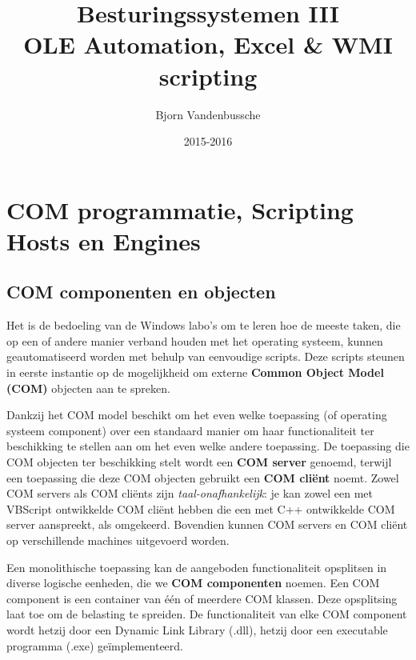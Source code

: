 \documentclass[11pt,a4paper]{report}
\title{Besturingssystemen III \\ \Large{OLE Automation, Excel \& WMI scripting}}
\author{Bjorn Vandenbussche}
\date{2015-2016}
\begin{document}
\maketitle
\tableofcontents
\chapter{COM programmatie, Scripting Hosts en Engines}
\section{COM componenten en objecten}
Het is de bedoeling van de Windows labo's om te leren hoe de meeste taken, die op een of andere manier verband houden met het operating systeem, kunnen geautomatiseerd worden met behulp van eenvoudige scripts. Deze scripts steunen in eerste instantie op de mogelijkheid om externe \textbf{Common Object Model (COM)} objecten aan te spreken. 
\par Dankzij het COM model beschikt om het even welke toepassing (of operating systeem component) over een standaard manier om haar functionaliteit ter beschikking te stellen aan om het even welke andere toepassing. De toepassing die COM objecten ter beschikking stelt wordt een \textbf{COM server} genoemd, terwijl een toepassing die deze COM objecten gebruikt een \textbf{COM cliënt} noemt. Zowel COM servers als COM cliënts zijn \textit{taal-onafhankelijk}: je kan zowel een met VBScript ontwikkelde COM cliënt hebben die een met C++ ontwikkelde COM server aanspreekt, als omgekeerd. Bovendien kunnen COM servers en COM cliënt op verschillende machines uitgevoerd worden.
\par Een monolithische toepassing kan de aangeboden functionaliteit opsplitsen in diverse logische eenheden, die we \textbf{COM componenten} noemen. Een COM component is een container van één of meerdere COM klassen. Deze opsplitsing laat toe om de belasting te spreiden. De functionaliteit van elke COM component wordt hetzij door een Dynamic Link Library (.dll), hetzij door een executable programma (.exe) geïmplementeerd.
\newpage
\end{document}

